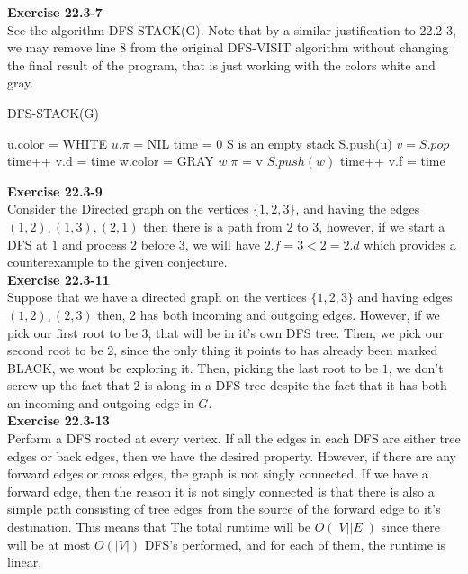 \documentclass{article}
\begin{document}
\noindent\textbf{Exercise 22.3-7}\\
See the algorithm DFS-STACK(G). Note that by a similar justification to 22.2-3, we may remove line 8 from the original DFS-VISIT algorithm without changing the final result of the program, that is just working with the colors white and gray.
\begin{algorithm}
\caption{DFS-STACK(G)}
\begin{algorithmic}
\State u.color = WHITE
\State $u.\pi$ = NIL
\EndFor
\State time = 0
\State S is an empty stack
\State S.push(u)
\State $v = S.pop$
\State time++
\State v.d = time
\State w.color = GRAY
\State $w.\pi$ = v
\State $S.push(w)$
\EndIf
\EndFor
\State time++
\State v.f = time
\EndWhile
\EndWhile
\end{algorithmic}
\end{algorithm}

\noindent\textbf{Exercise 22.3-9}\\
Consider the Directed graph on the vertices $\{1,2,3\}$, and having the edges $(1,2),(1,3),(2,1)$ then there is a path from $2$ to $3$, however, if we start a DFS at $1$ and process $2$ before $3$, we will have $2.f = 3 < 2 = 2.d$ which provides a counterexample to the given conjecture.\\


\noindent\textbf{Exercise 22.3-11}\\
Suppose that we have a directed graph on the vertices $\{1,2,3\}$ and having edges $(1,2),(2,3)$ then, 2 has both incoming and outgoing edges. However, if we pick our first root to be $3$, that will be in it's own DFS tree. Then, we pick our second root to be $2$, since the only thing it points to has already been marked BLACK, we wont be exploring it. Then, picking the last root to be $1$, we don't screw up the fact that $2$ is along in a DFS tree despite the fact that it has both an incoming and outgoing edge in $G$.\\


\noindent\textbf{Exercise 22.3-13}\\
Perform a DFS rooted at every vertex. If all the edges in each DFS are either tree edges or back edges, then we have the desired property. However, if there are any forward edges or cross edges, the graph is not singly connected. If we have a forward edge, then the reason it is not singly connected is that there is also a simple path consisting of tree edges from the source of the forward edge to it's destination. %
This means that The total runtime will be $O(|V||E|)$ since there will be at most $O(|V|)$ DFS's performed, and for each of them, the runtime is linear.
\end{document}
